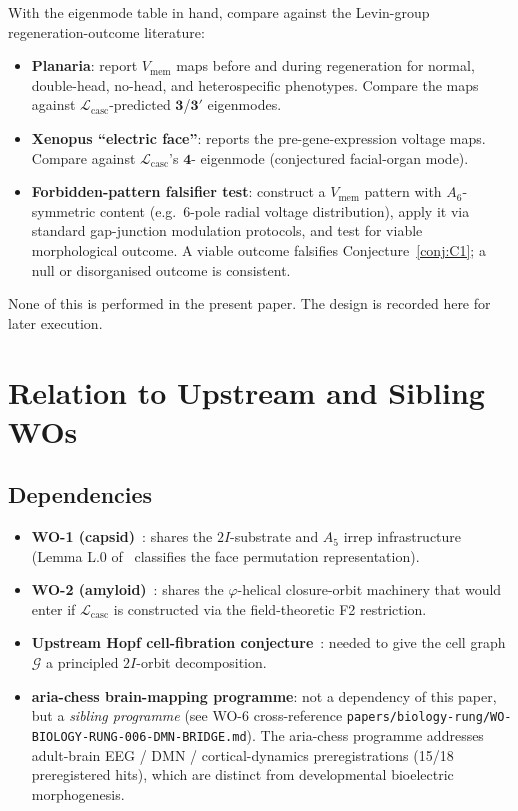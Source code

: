 \documentclass[12pt]{article}
\newcommand{\phig}{\varphi}
\newcommand{\Lcasc}{\mathcal{L}_{\mathrm{casc}}}
\begin{document}
With the eigenmode table in hand, compare against the Levin-group
regeneration-outcome literature:
\begin{itemize}
\item \textbf{Planaria}: \cite{LevinBeane2011,DurantLevin2017}
  report $V_{\mathrm{mem}}$ maps before and during regeneration
  for normal, double-head, no-head, and heterospecific
  phenotypes. Compare the maps against $\Lcasc$-predicted
  $\mathbf{3}$/$\mathbf{3}'$ eigenmodes.
\item \textbf{Xenopus ``electric face''}:
  \cite{PietakLevin2016} reports the pre-gene-expression
  voltage maps. Compare against $\Lcasc$'s $\mathbf{4}$-
  eigenmode (conjectured facial-organ mode).
\item \textbf{Forbidden-pattern falsifier test}: construct a
  $V_{\mathrm{mem}}$ pattern with $A_6$-symmetric content (e.g.\
  6-pole radial voltage distribution), apply it via standard
  gap-junction modulation protocols, and test for viable
  morphological outcome. A viable outcome falsifies
  Conjecture~\ref{conj:C1}; a null or disorganised outcome is
  consistent.
\end{itemize}

None of this is performed in the present paper. The design is
recorded here for later execution.

\section{Relation to Upstream and Sibling WOs}\label{sec:rel}

\subsection{Dependencies}

\begin{itemize}
\item \textbf{WO-1 (capsid)}~\cite{SmartCapsid}: shares the
  $2I$-substrate and $A_5$ irrep infrastructure
  (Lemma L.0 of~\cite{SmartCapsid} classifies the face
  permutation representation).
\item \textbf{WO-2 (amyloid)}~\cite{SmartAmyloid}: shares the
  $\phig$-helical closure-orbit machinery that would enter if
  $\Lcasc$ is constructed via the field-theoretic F2 restriction.
\item \textbf{Upstream Hopf cell-fibration
  conjecture}~\cite[\S 2.6]{CascadeBio}: needed to give the
  cell graph $\mathcal{G}$ a principled $2I$-orbit
  decomposition.
\item \textbf{aria-chess brain-mapping
  programme}: not a dependency of this paper, but a
  \emph{sibling programme} (see WO-6 cross-reference
  \texttt{papers/biology-rung/WO-BIOLOGY-RUNG-006-DMN-BRIDGE.md}). The
  aria-chess programme addresses adult-brain
  EEG / DMN / cortical-dynamics preregistrations
  (15/18 preregistered hits), which are distinct from
  developmental bioelectric morphogenesis.
\end{itemize}
\end{document}
